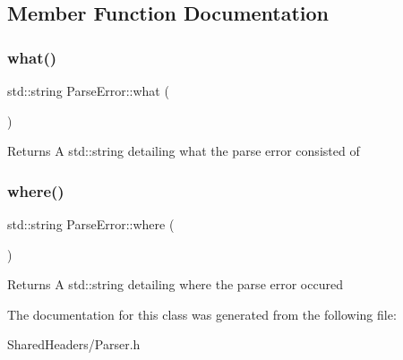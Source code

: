 \subsection{Member Function Documentation}
\mbox{\label{classParseError_a08560dce27779ffee6c4bfb0d796aa6e}} 
\subsubsection{\texorpdfstring{what()}{what()}}
{\footnotesize\ttfamily std\+::string Parse\+Error\+::what (\begin{DoxyParamCaption}{ }\end{DoxyParamCaption})\hspace{0.3cm}{\ttfamily [inline]}}

\begin{DoxyReturn}{Returns}
A std\+::string detailing what the parse error consisted of 
\end{DoxyReturn}
\mbox{\label{classParseError_aa725d47c84792c9142267e51c2074f58}} 
\subsubsection{\texorpdfstring{where()}{where()}}
{\footnotesize\ttfamily std\+::string Parse\+Error\+::where (\begin{DoxyParamCaption}{ }\end{DoxyParamCaption})\hspace{0.3cm}{\ttfamily [inline]}}

\begin{DoxyReturn}{Returns}
A std\+::string detailing where the parse error occured 
\end{DoxyReturn}


The documentation for this class was generated from the following file\+:\begin{DoxyCompactItemize}
\item 
Shared\+Headers/Parser.\+h\end{DoxyCompactItemize}
